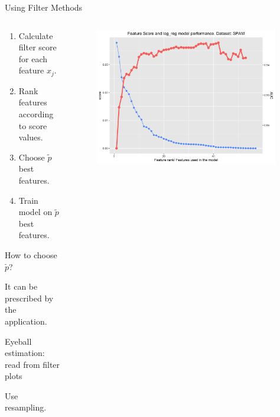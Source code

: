 \documentclass[11pt,compress,t,notes=noshow, xcolor=table]{beamer}
\begin{document}
\begin{vbframe}{Using Filter Methods}
  


  \begin{columns}
    \begin{column}{0.65\textwidth}
      \begin{enumerate}{}
        \setlength{\itemsep}{1.2em}
          \item Calculate filter score for each feature $x_j$.
          \item Rank features according to score values.
          \item Choose $\tilde{p}$ best features.
          \item Train model on $\tilde{p}$ best features.
        \end{enumerate}
      
        \begin{blocki}{How to choose $\tilde{p}$?}
          \item It can be prescribed by the application.
          \item Eyeball estimation: read from filter plots
          \item Use resampling.
        \end{blocki}
    \end{column}

    \begin{column}{0.5\textwidth}
      \begin{figure}
        \centering
        \includegraphics[width=0.98\textwidth, height=0.45\textheight]{figure/fs-filters-scree-plot.png} %
      \end{figure}
    \end{column}
  

\end{columns}
\end{vbframe}
\end{document}
